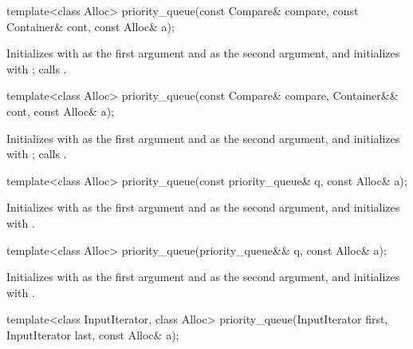 %
\begin{itemdecl}
template<class Alloc>
  priority_queue(const Compare& compare, const Container& cont, const Alloc& a);
\end{itemdecl}

\begin{itemdescr}
\pnum
\effects
Initializes  with  as the first argument and  as the second
argument, and initializes  with ;
calls .
\end{itemdescr}

%
\begin{itemdecl}
template<class Alloc>
  priority_queue(const Compare& compare, Container&& cont, const Alloc& a);
\end{itemdecl}

\begin{itemdescr}
\pnum
\effects
Initializes  with  as the first argument and 
as the second argument, and initializes  with ;
calls .
\end{itemdescr}

%
\begin{itemdecl}
template<class Alloc> priority_queue(const priority_queue& q, const Alloc& a);
\end{itemdecl}

\begin{itemdescr}
\pnum
\effects
Initializes  with  as the first argument and  as
the second argument, and initializes  with .
\end{itemdescr}

%
\begin{itemdecl}
template<class Alloc> priority_queue(priority_queue&& q, const Alloc& a);
\end{itemdecl}

\begin{itemdescr}
\pnum
\effects
Initializes  with  as the first argument and 
as the second argument, and initializes  with .
\end{itemdescr}

%
\begin{itemdecl}
template<class InputIterator, class Alloc>
  priority_queue(InputIterator first, InputIterator last, const Alloc& a);
\end{itemdecl}

